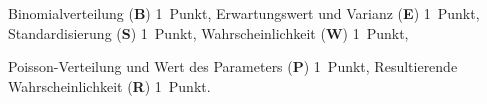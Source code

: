 \begin{bewertung}
\begin{teilaufgaben}
\item
Binomialverteilung ({\bf B}) 1~Punkt,
Erwartungswert und Varianz ({\bf E}) 1~Punkt,
Standardisierung ({\bf S}) 1~Punkt,
Wahrscheinlichkeit ({\bf W}) 1~Punkt,
\item
Poisson-Verteilung und Wert des Parameters ({\bf P}) 1~Punkt,
Resultierende Wahrscheinlichkeit ({\bf R}) 1~Punkt.
\end{teilaufgaben}
\end{bewertung}

